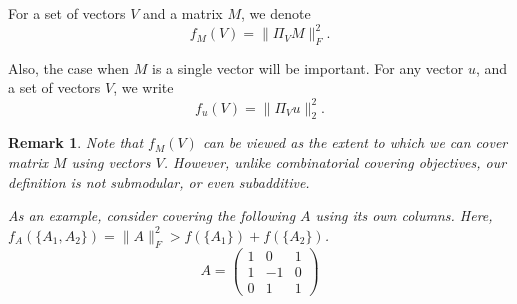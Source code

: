 \documentclass{article}
\newtheorem{defin}{Definition}\newtheorem{thm}{Theorem}\newtheorem{exe}{Exercise}\newtheorem{exa}{Example}\newtheorem{fact}{Fact}\newtheorem{prop}{Proposition}\newtheorem{lemma}{Lemma}\newtheorem{corol}{Corollary}\newtheorem{conj}{Conjecture}\newtheorem{remark}{Remark}\newtheorem{discussion}{Discussion}\newtheorem{conc}{Conclusion}
\newcommand{\Real}{\mathbb{R}}
\newcommand{\argmin}{\text{arg min}}
\newcommand{\argmax}{\text{arg max}}
\newcommand{\Pow}{\mathcal{P}}
\newcommand{\norm}[1]{\lVert #1 \rVert}
\begin{document}
For a set of vectors $V$ and a matrix $M$, we denote
\[ f_M(V)  = \norm{\Pi_V M}_F^2. \]
\iffalse
In this article, instead of minimizing the unexplained (error) part $\|A - \Pi_{A[S]}A\|_F^2$ of $A$, we maximize the explained part $\|\Pi_{A[S]}A\|_F^2$ of $A$. Formally,
\begin{align}
\argmax_{S \subseteq [n], |S| = k} \|\Pi_{A[S]}A\|_F^2
= \argmin_{S \subseteq [n], |S| = k} \|A - \Pi_{A[S]}A\|_F^2
\end{align}
Thus, a subset of columns that maximizes explanation of $A$ will also minimized the unexplained error.
\fi
Also, the case when $M$ is a single vector will be important. For any vector $u$, and a set of vectors $V$, we write
\[  f_u(V) = \norm{\Pi_V u}_2^2. \]

\begin{remark} \label{rem:not-submodular} Note that $f_M (V)$ can be viewed as the extent to which we can {\em cover} matrix $M$ using vectors $V$.  However, unlike combinatorial covering objectives, our definition is not submodular, or even subadditive.
\iffalse
\begin{defin} \label{f definition matrix}
Given $A \in \Real^{m \times n}$, define the function: $f_A : \Pow(\Real^m) \to \Real$ by: $$f_A(S) = \sum_{j=1}^n f_{A_j}(S)$$ over the columns $A_j \in \Real^m$ of $A$. 
\end{defin}
\fi
As an example, consider covering the following $A$ using its own columns. Here, $f_A(\{A_1, A_2\}) = \|A\|_F^2 > f(\{A_1\}) + f(\{A_2\})$.
\[ A = \left( \begin{array}{ccc}
1 & 0 & 1 \\
1 & -1 & 0 \\
0 & 1 & 1 \end{array} \right)\]
\end{remark}

\iffalse
\subsection{Overview of article}
In section 2.1, we present a ``vanilla'' greedy algorithm GREEDY for choosing $k$ columns of a matrix $A$ that can approximate all of $A$'s other columns linearly. This provides intuition for our proposed algorithm ALG, presented in section 2.2. ALG is a much more efficient version of GREEDY because of three optimizations: (1) an efficient calculation of marginal gain; (2) a random projection to compress the ambient dimension of $A$'s columns; and (3) only looking over a small random subset of all $n$ columns in each iteration. These optimizations make analyzing ALG slightly more involved than GREEDY. To this end, we first analyze GREEDY in section 3, and then use those results to analyze ALG in section 4.
\fi
\end{document}
